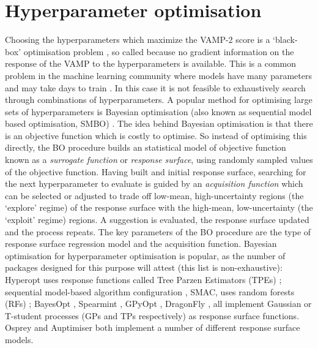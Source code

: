 \section{Hyperparameter optimisation}
Choosing the hyperparameters which maximize the VAMP-2 score is a `black-box' optimisation problem \cite{jonesEfficientGlobalOptimization1998a}, so called because no gradient information on the response of the VAMP to the hyperparameters is available. This is a common problem in the machine learning community where models have many parameters and may take days to train \cite{feurer2019hyperparameter}. In this case it is not feasible to exhaustively search through combinations of hyperparameters. A popular method for optimising large sets of hyperparameters is Bayesian optimisation (also known as sequential model based optimisation, SMBO)  \cite{hutterSequentialModelbasedOptimization2011} \cite{NIPS2012_4522}\cite{bergstraAlgorithmsHyperParameterOptimizationa} \cite{bergstraMakingScienceModel2013}. The idea behind Bayesian optimisation is  \cite{brochuTutorialBayesianOptimization2010}\cite{shahriariTakingHumanOut2016} that there is an objective function which is costly to optimise. So instead of optimising this directly, the BO procedure builds an statistical model of  objective function known as a \emph{surrogate function} or \emph{response surface}, using randomly sampled  values of the objective function. Having built and initial response surface, searching for the next hyperparameter to evaluate is guided by an \emph{acquisition function} which can be selected or adjusted to trade off low-mean, high-uncertainty regions (the `explore' regime) of the response surface with the high-mean, low-uncertainty (the `exploit' regime) regions. A suggestion is evaluated, the response surface updated and the process repeats. The key parameters of the BO procedure are the type of response surface regression model and the acquisition function. Bayesian optimisation for hyperparameter optimisation is popular, as the number of packages designed for this purpose will attest (this list is non-exhaustive): Hyperopt \cite{bergstraHyperoptPythonLibrary2013} uses response functions called Tree Parzen Estimators (TPEs) \cite{bergstraAlgorithmsHyperParameterOptimization}; sequential model-based algorithm configuration  \cite{hutterSequentialModelbasedOptimization2011}, SMAC, uses random forests (RFs) \cite{breimanRandomForests2001}; BayesOpt \cite{martinez-cantinBayesOptBayesianOptimization2014}, Spearmint \cite{DBLP:conf/uai/GelbartSA14}\cite{snoekAbstractBayesianOptimization2013}\cite{snoekInputWarpingBayesian2014a}\cite{NIPS2013_5086}\cite{NIPS2012_4522}, GPyOpt \cite{gpyopt2016}, DragonFly \cite{JMLR:v21:18-223}, all implement Gaussian or T-student processes  (GPs and TPs respectively) \cite{rasmussenGaussianProcessesMachine2006} as response surface functions. Osprey \cite{mcgibbonOspreyHyperparameterOptimization2016a} and Auptimiser \cite{liuAuptimizerExtensibleOpenSource2019} both implement a number of different response surface models. 

